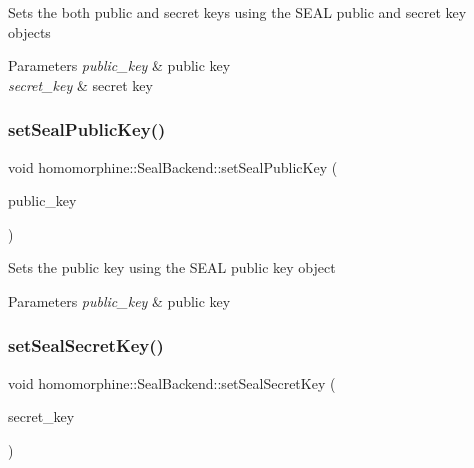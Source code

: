 Sets the both public and secret keys using the S\+E\+AL public and secret key objects


\begin{DoxyParams}{Parameters}
{\em public\+\_\+key} & public key \\
\hline
{\em secret\+\_\+key} & secret key \\
\hline
\end{DoxyParams}
\mbox{\label{classhomomorphine_1_1_seal_backend_a507f226b61253d9849925c56c666647f}} 
\subsubsection{\texorpdfstring{setSealPublicKey()}{setSealPublicKey()}}
{\footnotesize\ttfamily void homomorphine\+::\+Seal\+Backend\+::set\+Seal\+Public\+Key (\begin{DoxyParamCaption}\item[{Public\+Key}]{public\+\_\+key }\end{DoxyParamCaption})}

Sets the public key using the S\+E\+AL public key object


\begin{DoxyParams}{Parameters}
{\em public\+\_\+key} & public key \\
\hline
\end{DoxyParams}
\mbox{\label{classhomomorphine_1_1_seal_backend_a29fe49c698da831effdb80fb32def045}} 
\subsubsection{\texorpdfstring{setSealSecretKey()}{setSealSecretKey()}}
{\footnotesize\ttfamily void homomorphine\+::\+Seal\+Backend\+::set\+Seal\+Secret\+Key (\begin{DoxyParamCaption}\item[{Secret\+Key}]{secret\+\_\+key }\end{DoxyParamCaption})}

